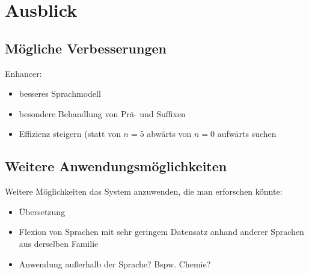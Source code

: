 \documentclass[a4paper]{article}
\begin{document}
\section{Ausblick}
\label{sec:future_work}
\subsection{Mögliche Verbesserungen}
Enhancer:
\begin{itemize}
    \item besseres Sprachmodell
    \item besondere Behandlung von Prä- und Suffixen
    \item Effizienz steigern (statt von $n=5$ abwärts von $n=0$ aufwärts suchen
\end{itemize}

\subsection{Weitere Anwendungsmöglichkeiten}
Weitere Möglichkeiten das System anzuwenden, die man erforschen könnte:
\begin{itemize}
    \item Übersetzung
    \item Flexion von Sprachen mit sehr geringem Datensatz anhand anderer Sprachen aus derselben Familie
    \item Anwendung außerhalb der Sprache? Bspw. Chemie? 
\end{itemize}




\appendix
\end{document}
